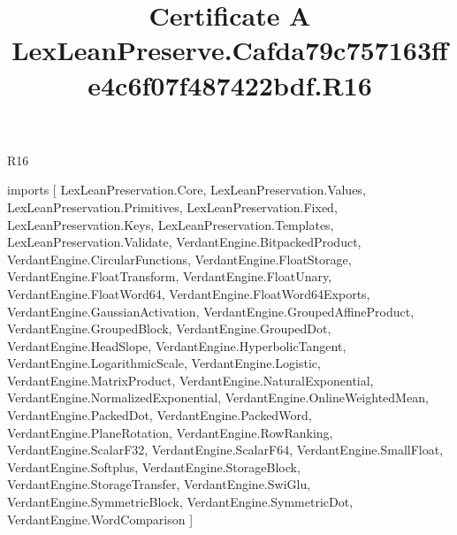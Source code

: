 \begin{lexlean}{R16}
\title{Certificate A LexLeanPreserve.Cafda79c757163ffe4c6f07f487422bdf.R16}
\begin{coremodule}
imports [
  LexLeanPreservation.Core,
  LexLeanPreservation.Values,
  LexLeanPreservation.Primitives,
  LexLeanPreservation.Fixed,
  LexLeanPreservation.Keys,
  LexLeanPreservation.Templates,
  LexLeanPreservation.Validate,
  VerdantEngine.BitpackedProduct,
  VerdantEngine.CircularFunctions,
  VerdantEngine.FloatStorage,
  VerdantEngine.FloatTransform,
  VerdantEngine.FloatUnary,
  VerdantEngine.FloatWord64,
  VerdantEngine.FloatWord64Exports,
  VerdantEngine.GaussianActivation,
  VerdantEngine.GroupedAffineProduct,
  VerdantEngine.GroupedBlock,
  VerdantEngine.GroupedDot,
  VerdantEngine.HeadSlope,
  VerdantEngine.HyperbolicTangent,
  VerdantEngine.LogarithmicScale,
  VerdantEngine.Logistic,
  VerdantEngine.MatrixProduct,
  VerdantEngine.NaturalExponential,
  VerdantEngine.NormalizedExponential,
  VerdantEngine.OnlineWeightedMean,
  VerdantEngine.PackedDot,
  VerdantEngine.PackedWord,
  VerdantEngine.PlaneRotation,
  VerdantEngine.RowRanking,
  VerdantEngine.ScalarF32,
  VerdantEngine.ScalarF64,
  VerdantEngine.SmallFloat,
  VerdantEngine.Softplus,
  VerdantEngine.StorageBlock,
  VerdantEngine.StorageTransfer,
  VerdantEngine.SwiGlu,
  VerdantEngine.SymmetricBlock,
  VerdantEngine.SymmetricDot,
  VerdantEngine.WordComparison
]


\end{coremodule}
\end{lexlean}
